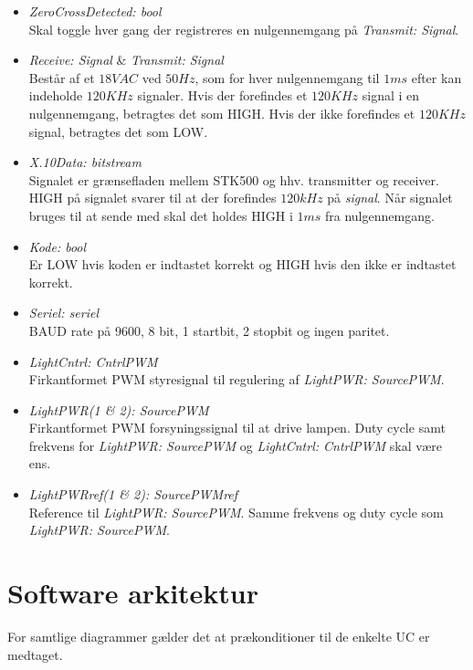 \begin{itemize}
\item \emph{ZeroCrossDetected: bool} \\
Skal toggle hver gang der registreres en nulgennemgang på \emph{Transmit: Signal}.

\item \emph{Receive: Signal} \& \emph{Transmit: Signal} \\
Består af et $18 VAC$ ved $50 Hz$, som for hver nulgennemgang til $1 ms$ efter kan indeholde $120 KHz$ signaler. Hvis der forefindes et $120 KHz$ signal i en nulgennemgang, betragtes det som HIGH. Hvis der ikke forefindes et $120 KHz$ signal, betragtes det som LOW.

\item \emph{X.10Data: bitstream} \\
Signalet er grænsefladen mellem STK500 og hhv. transmitter og receiver. HIGH på signalet svarer til at der forefindes $120 kHz$ på \emph{signal}. Når signalet bruges til at sende med skal det holdes HIGH i $1 ms$ fra nulgennemgang.

\item \emph{Kode: bool} \\
Er LOW hvis koden er indtastet korrekt og HIGH hvis den ikke er indtastet korrekt.

\item \emph{Seriel: seriel} \\
BAUD rate på 9600, 8 bit, 1 startbit, 2 stopbit og ingen paritet.

\item \emph{LightCntrl: CntrlPWM} \\
Firkantformet PWM styresignal til regulering af \emph{LightPWR: SourcePWM}.

\item \emph{LightPWR(1 \& 2): SourcePWM} \\
Firkantformet PWM forsyningssignal til at drive lampen. Duty cycle samt frekvens for \emph{LightPWR: SourcePWM} og \emph{LightCntrl: CntrlPWM} skal være ens.

\item \emph{LightPWRref(1 \& 2): SourcePWMref} \\
Reference til \emph{LightPWR: SourcePWM}. Samme frekvens og duty cycle som \emph{LightPWR: SourcePWM}.
\end{itemize}


\section{Software arkitektur}
For samtlige diagrammer gælder det at prækonditioner til de enkelte UC er medtaget.

